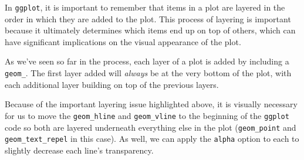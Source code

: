 \documentclass[
  letterpaper,
]{krantz}
\begin{document}
\begin{tcolorbox}[enhanced jigsaw, left=2mm, toprule=.15mm, opacitybacktitle=0.6, leftrule=.75mm, bottomrule=.15mm, colbacktitle=quarto-callout-important-color!10!white, breakable, colback=white, bottomtitle=1mm, toptitle=1mm, title=\textcolor{quarto-callout-important-color}{\faExclamation}\hspace{0.5em}{Important}, coltitle=black, titlerule=0mm, arc=.35mm, opacityback=0, colframe=quarto-callout-important-color-frame, rightrule=.15mm]

In \texttt{ggplot}, it is important to remember that items in a plot are
layered in the order in which they are added to the plot. This process
of layering is important because it ultimately determines which items
end up on top of others, which can have significant implications on the
visual appearance of the plot.

As we've seen so far in the process, each layer of a plot is added by
including a \texttt{geom\_}. The first layer added will \emph{always} be
at the very bottom of the plot, with each additional layer building on
top of the previous layers.

\end{tcolorbox}

Because of the important layering issue highlighted above, it is
visually necessary for us to move the \texttt{geom\_hline} and
\texttt{geom\_vline} to the beginning of the \texttt{ggplot} code so
both are layered underneath everything else in the plot
(\texttt{geom\_point} and \texttt{geom\_text\_repel} in this case). As
well, we can apply the \texttt{alpha} option to each to slightly
decrease each line's transparency.
\end{document}
